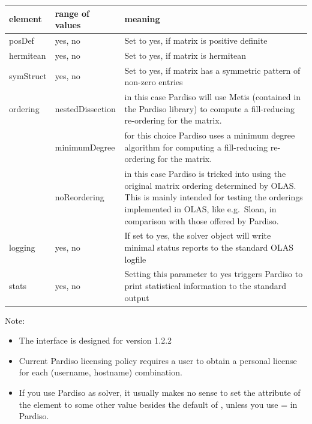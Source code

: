 \begin{center}
\begin{tabular}{llp{}}
\toprule
element & range of values & meaning \\
\midrule
posDef     & yes, no & Set to yes, if matrix is positive definite\\
\midrule
hermitean  & yes, no & Set to yes, if matrix is hermitean\\
\midrule
symStruct  & yes, no & Set to yes, if matrix has a symmetric pattern
                       of non-zero entries\\
\midrule
ordering & nestedDissection & in this case Pardiso will use Metis (contained
                              in the Pardiso library) to compute a
                              fill-reducing re-ordering for the matrix.\\
         & minimumDegree    & for this choice Pardiso uses a minimum degree
                              algorithm for computing a
                              fill-reducing re-ordering for the matrix.\\
         & noReordering     & in this case Pardiso is tricked into using the
                              original matrix ordering determined by OLAS.
                              This is mainly intended for testing the orderings
                              implemented in OLAS, like e.g.~Sloan, in
                              comparison with those offered by Pardiso.\\
\midrule
logging    & yes, no & If set to yes, the solver object will write minimal
                       status reports to the standard OLAS logfile\\
\midrule
stats      & yes, no & Setting this parameter to yes triggers Pardiso to print
                       statistical information to the standard output\\
\bottomrule
\end{tabular}
\end{center}
%
%
Note:
\begin{itemize}
\item The interface is designed for version 1.2.2
\item Current Pardiso licensing policy requires a user to obtain a personal
      license for each (username, hostname) combination.
\item If you use Pardiso as solver, it usually makes no sense to set
      the  attribute of the  element to some
other
      value besides the default of , unless you use
       =  in Pardiso.
\end{itemize}
%
%
